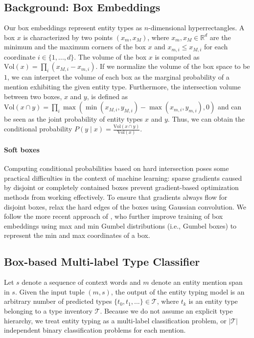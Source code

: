 \documentclass[11pt,a4paper]{article}
\begin{document}
\subsection{Background: Box Embeddings}
\label{sec:background}
Our box embeddings represent entity types as $n$-dimensional hyperrectangles. A box $x$ is characterized by two points $(x_m, x_M)$, where $x_m, x_M \in \mathbb{R}^d$ are the minimum and the maximum corners of the box $x$ and $x_{m, i} \leq x_{M, i}$ for each coordinate $i \in \{1, ..., d\}$. The volume of the box $x$ is computed as $\text{Vol}(x) = \prod_{i} (x_{M, i} - x_{m, i})$. If we normalize the volume of the box space to be $1$, we can interpret the volume of each box as the marginal probability of a mention exhibiting the given entity type. Furthermore, the intersection volume between two boxes, $x$ and $y$, is defined as $\text{Vol}(x \cap y) = \prod_{i} \max\left(\min(x_{M, i}, y_{M, i}) - \max(x_{m, i}, y_{m, i}), 0\right)$ and can be seen as the joint probability of entity types $x$ and $y$. Thus, we can obtain the conditional probability $P (y \mid x) = \frac{\text{Vol}(x \cap y)}{\text{Vol}(x)}$. 

\paragraph{Soft boxes}
Computing conditional probabilities based on hard intersection poses some practical difficulties in the context of machine learning: sparse gradients caused by disjoint or completely contained boxes prevent gradient-based optimization methods from working effectively.
To ensure that gradients always flow for disjoint boxes, \citet{Xiang_Li_19} relax the hard edges of the boxes using Gaussian convolution. We follow the more recent approach of \citet{Shib_Sankar_Dasgupta_20}, who further improve training of box embeddings using max and min Gumbel distributions (i.e., Gumbel boxes) to represent the min and max coordinates of a box.


\subsection{Box-based Multi-label Type Classifier}
\label{sec:box-based-mltc}

Let $s$ denote a sequence of context words and $m$ denote an entity mention span in $s$. Given the input tuple $(m, s)$, the output of the entity typing model is an arbitrary number of predicted types $\{t_0, t_1, ...\}  \in \mathcal{T}$, where $t_k$ is an entity type belonging to a type inventory $\mathcal{T}$. Because we do not assume an explicit type hierarchy, we treat entity typing as a multi-label classification problem, or $|\mathcal{T}|$ independent binary classification problems for each mention. 
\end{document}
